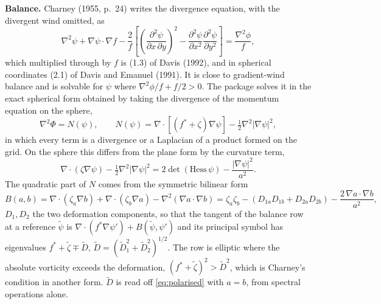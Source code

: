 \documentclass[11pt,a4paper]{article}
\newcommand{\ddd}[2]{\frac{\partial^2 #1}{\partial #2^2}}
\newcommand{\lap}{\nabla^2}
\newcommand{\grad}{\nabla}
\begin{document}
\textbf{Balance.} Charney (1955, p.~24) writes the divergence equation, with
the divergent wind omitted, as
\begin{equation}
\lap\psi + \grad\psi\cdot\grad f
 - \frac{2}{f}\left[
   \left(\frac{\partial^2\psi}{\partial x\,\partial y}\right)^{\!2}
   - \ddd{\psi}{x}\ddd{\psi}{y}
 \right]
 = \frac{\lap\phi}{f} ,
\label{eq:charney}
\end{equation}
which multiplied through by $f$ is (1.3) of Davis (1992), and in spherical
coordinates (2.1) of Davis and Emanuel (1991). It is close to gradient-wind
balance and is solvable for $\psi$ where $\lap\phi/f + f/2>0$. The package
solves it in the exact spherical form obtained by taking the divergence of the
momentum equation on the sphere,
\begin{equation}
\lap\Phi = N(\psi),
\qquad
N(\psi) = \grad\cdot\left[\left(f^{*}+\zeta\right)\grad\psi\right]
 - \tfrac12\lap\left|\grad\psi\right|^2 ,
\label{eq:Nform}
\end{equation}
in which every term is a divergence or a Laplacian of a product formed on the
grid. On the sphere this differs from the plane form by the curvature term,
\begin{equation}
\grad\cdot\left(\zeta\grad\psi\right) - \tfrac12\lap\left|\grad\psi\right|^2
 = 2\det\left(\mathrm{Hess}\,\psi\right) - \frac{\left|\grad\psi\right|^2}{a^2}.
\label{eq:curvature}
\end{equation}
The quadratic part of $N$ comes from the symmetric bilinear form
\begin{equation}
B(a,b) = \grad\cdot\left(\zeta_a\grad b\right)
 + \grad\cdot\left(\zeta_b\grad a\right)
 - \lap\left(\grad a\cdot\grad b\right)
 = \zeta_a\zeta_b - \left(D_{1a}D_{1b} + D_{2a}D_{2b}\right)
 - \frac{2\,\grad a\cdot\grad b}{a^2},
\label{eq:polarised}
\end{equation}
$D_1,D_2$ the two deformation components, so that the tangent of the balance
row at a reference $\tilde\psi$ is $\grad\cdot(f^{*}\grad\psi')+B(\tilde\psi,\psi')$
and its principal symbol has eigenvalues $f^{*}+\tilde\zeta\mp\tilde D$,
$\tilde D=(\tilde D_1^2+\tilde D_2^2)^{1/2}$. The row is elliptic where the
absolute vorticity exceeds the deformation, $(f^{*}+\tilde\zeta)^2>\tilde D^2$,
which is Charney's condition in another form. $\tilde D$ is read off
\eqref{eq:polarised} with $a=b$, from spectral operations alone.
\end{document}
